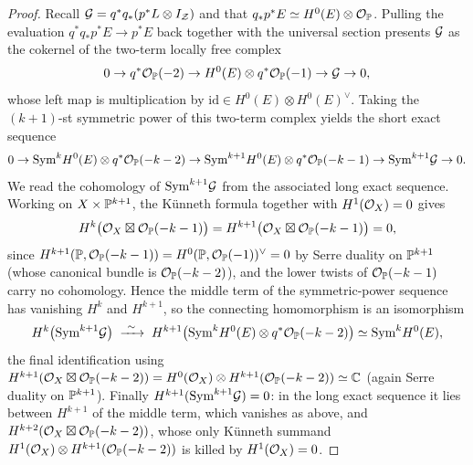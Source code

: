 \begin{proof}
  Recall \(\mathcal{G}=q^*q_*(p^*L\otimes I_{\mathcal{Z}})\) and that
  \(q_*p^*E\simeq H^0(E)\otimes\mathcal{O}_{\mathbb{P}}\).  Pulling the evaluation
  \(q^*q_*p^*E\to p^*E\) back together with the universal section presents \(\mathcal{G}\)
  as the cokernel of the two-term locally free complex
  \[
    0\to q^*\mathcal{O}_{\mathbb{P}}(-2)\to H^0(E)\otimes q^*\mathcal{O}_{\mathbb{P}}(-1)\to\mathcal{G}\to0 ,
  \]
  whose left map is multiplication by
  \(\mathrm{id}\in H^0(E)\otimes H^0(E)^\vee\).  Taking the \((k+1)\)-st symmetric power
  of this two-term complex yields the short exact sequence
  \[
    0\to\mathrm{Sym}^kH^0(E)\otimes q^*\mathcal{O}_{\mathbb{P}}(-k-2)
      \to\mathrm{Sym}^{k+1}H^0(E)\otimes q^*\mathcal{O}_{\mathbb{P}}(-k-1)
      \to\mathrm{Sym}^{k+1}\mathcal{G}\to0 .
  \]
  We read the cohomology of \(\mathrm{Sym}^{k+1}\mathcal{G}\) from the associated long exact
  sequence.  Working on \(X\times\mathbb{P}^{k+1}\), the Künneth formula together with
  \(H^1(\mathcal{O}_X)=0\) gives
  \[
    H^k\bigl(\mathcal{O}_X\boxtimes\mathcal{O}_{\mathbb{P}}(-k-1)\bigr)
      =H^{k+1}\bigl(\mathcal{O}_X\boxtimes\mathcal{O}_{\mathbb{P}}(-k-1)\bigr)=0 ,
  \]
  since \(H^{k+1}(\mathbb{P},\mathcal{O}_{\mathbb{P}}(-k-1))=H^0(\mathbb{P},\mathcal{O}_{\mathbb{P}}(-1))^\vee=0\) by Serre
  duality on \(\mathbb{P}^{k+1}\) (whose canonical bundle is \(\mathcal{O}_{\mathbb{P}}(-k-2)\)), and the
  lower twists of \(\mathcal{O}_{\mathbb{P}}(-k-1)\) carry no cohomology.  Hence the middle term
  of the symmetric-power sequence has vanishing \(H^k\) and \(H^{k+1}\), so the
  connecting homomorphism is an isomorphism
  \[
    H^k\bigl(\Sym^{k+1}\cG\bigr)\;\xrightarrow{\ \sim\ }\;
    H^{k+1}\bigl(\Sym^kH^0(E)\otimes q^*\cO_{\PP}(-k-2)\bigr)
    \simeq\Sym^kH^0(E) ,
  \]
  the final identification using
  \(H^{k+1}(\mathcal{O}_X\boxtimes\mathcal{O}_{\mathbb{P}}(-k-2))=H^0(\mathcal{O}_X)\otimes
   H^{k+1}(\mathcal{O}_{\mathbb{P}}(-k-2))\simeq\mathbb{C}\) (again Serre duality on \(\mathbb{P}^{k+1}\)).
  Finally \(H^{k+1}(\mathrm{Sym}^{k+1}\mathcal{G})=0\): in the long exact sequence it lies between
  \(H^{k+1}\) of the middle term, which vanishes as above, and
  \(H^{k+2}(\mathcal{O}_X\boxtimes\mathcal{O}_{\mathbb{P}}(-k-2))\), whose only Künneth summand
  \(H^1(\mathcal{O}_X)\otimes H^{k+1}(\mathcal{O}_{\mathbb{P}}(-k-2))\) is killed by \(H^1(\mathcal{O}_X)=0\).
\end{proof}

